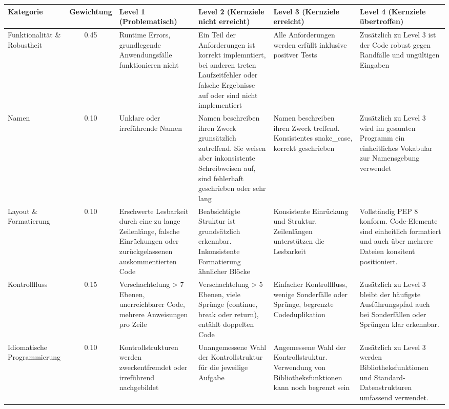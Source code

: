 \begin{table}
\centering
{\footnotesize
\setlength{\tabcolsep}{4pt}
\renewcommand{\arraystretch}{1.0}
\setlength{\extrarowheight}{2pt} %

\begin{tabularx}{\linewidth}{|>{\raggedright\arraybackslash}m{2.4cm}|c|Y|Y|Y|Y|}
\hline
\textbf{Kategorie} & \textbf{Gewichtung} & \textbf{Level 1 (Problematisch)} & \textbf{Level 2 (Kernziele nicht erreicht)} & \textbf{Level 3 (Kernziele erreicht)} & \textbf{Level 4 (Kernziele übertroffen)} \\
\hline
Funktionalität \& Robustheit & 0.45 & Runtime Errors, grundlegende Anwendungsfälle funktionieren nicht & Ein Teil der Anforderungen ist korrekt implemntiert, bei anderen treten Laufzeitfehler oder falsche Ergebnisse auf oder sind nicht implementiert & Alle Anforderungen werden erfüllt inklusive positver Tests & Zusätzlich zu Level 3 ist der Code robust gegen Randfälle und ungültigen Eingaben \\
\hline
Namen & 0.10 & Unklare oder irreführende Namen & Namen beschreiben ihren Zweck grunsätzlich zutreffend. Sie weisen aber inkonsistente Schreibweisen auf, sind fehlerhaft geschrieben oder sehr lang & Namen beschreiben ihren Zweck treffend. Konsistentes snake\_case, korrekt geschrieben & Zusätzlich zu Level 3 wird im gesamten Programm ein einheitliches Vokabular zur Namensgebung verwendet\\
\hline
Layout \& Formatierung & 0.10 & Erschwerte Lesbarkeit durch eine zu lange Zeilenlänge, falsche Einrückungen oder zurückgelassenen auskommentierten Code & Beabsichtigte Struktur ist grundsätzlich erkennbar. Inkonsistente Formatierung ähnlicher Blöcke & Konsistente Einrückung und Struktur. Zeilenlängen unterstützen die Lesbarkeit & Vollständig PEP 8 konform. Code-Elemente sind einheitlich formatiert und auch über mehrere Dateien konsitent positioniert. \\
\hline
Kontrollfluss & 0.15 &Verschachtelung > 7 Ebenen, unerreichbarer Code, mehrere Anweisungen pro Zeile & Verschachtelung > 5 Ebenen, viele Sprünge (continue, break oder return), entählt doppelten Code & Einfacher Kontrollfluss, wenige Sonderfälle oder Sprünge, begrenzte Codeduplikation & Zusätzlich zu Level 3 bleibt der häufigste Ausführungspfad auch bei Sonderfällen oder Sprüngen klar erkennbar. \\
\hline
Idiomatische Programmierung & 0.10 & Kontrollstrukturen werden zweckentfremdet oder irreführend nachgebildet & Unangemessene Wahl der Kontrollstruktur für die jeweilige Aufgabe & Angemessene Wahl der Kontrollstruktur. Verwendung von Bibliotheksfunktionen kann noch begrenzt sein & Zusätzlich zu Level 3 werden Bibliotheksfunktionen und Standard-Datenstrukturen umfassend verwendet.\\

\end{tabularx}}
\end{table}
